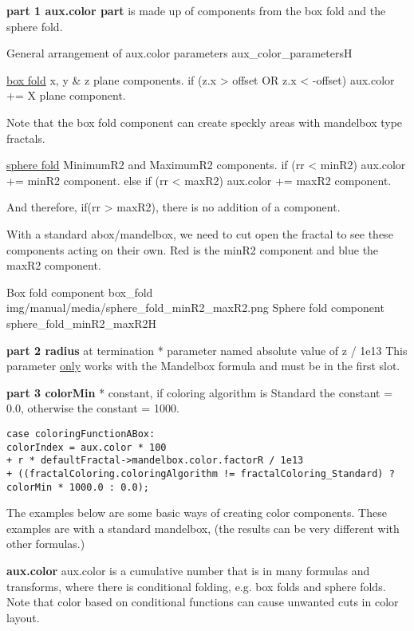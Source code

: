 \textbf{part 1 aux.color part} is made up of components from the box fold and the sphere fold.

{General arrangement of aux.color parameters}
{aux_color_parameters}{H}

\underline{box fold} x, y \& z plane components.
if  (z.x  >  offset  OR  z.x  <  -offset)   aux.color +=  X plane component.

Note that the box fold component can create speckly areas with mandelbox type fractals.

\underline{sphere fold} MinimumR2 and MaximumR2 components. 
if (rr < minR2)    aux.color +=  minR2 component.
else if (rr < maxR2)    aux.color +=  maxR2 component.

And therefore,  if(rr > maxR2), there is no addition of a component.

With a standard abox/mandelbox, we need to cut open the fractal to see these components acting on their own. Red is the minR2 component and blue the maxR2 component.

{Box fold component}
{box_fold}
{img/manual/media/sphere_fold_minR2_maxR2.png}
{Sphere fold component}
{sphere_fold_minR2_maxR2}{H}


\textbf{part 2 radius} at termination * parameter named absolute value of z  / 1e13 
This parameter \underline{only} works with the Mandelbox formula and must be in the first slot.


\textbf{part 3 colorMin} * constant, if coloring algorithm is Standard the constant = 0.0, otherwise the constant = 1000.

\begin{lstlisting}
case coloringFunctionABox:
colorIndex = aux.color * 100 
+ r * defaultFractal->mandelbox.color.factorR / 1e13 
+ ((fractalColoring.coloringAlgorithm != fractalColoring_Standard) ? colorMin * 1000.0 : 0.0); 
\end{lstlisting}






The examples below are some basic ways of creating color components. These examples are with a standard  mandelbox, (the results can be very different with other formulas.)


\textbf{aux.color}
aux.color is a cumulative number that is in many formulas and transforms,  where there is conditional folding, e.g. box folds and sphere folds. Note that color based on conditional functions can cause unwanted cuts in color layout.

